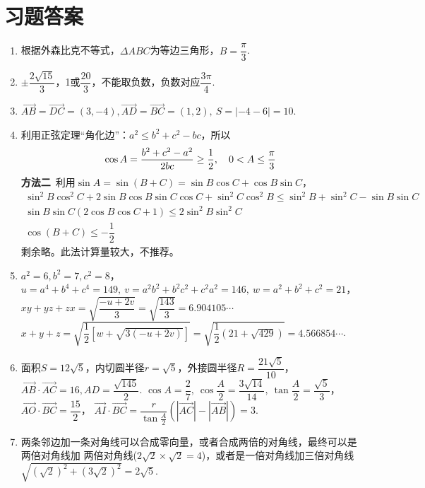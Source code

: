 \section{习题答案}
\begin{enumerate}[label={\textbf{\arabic*.}},leftmargin=
    \inteval{\myenumleftmargin}pt]
\item 
根据外森比克不等式，$ \Delta ABC $为等边三角形，$ B=\dfrac{\pi}{3} $. 

\item 
$ \pm\dfrac{2\sqrt{15}}{3} $，1或$ \dfrac{20}{3} $，不能取负数，负数对应$ \dfrac{3\pi}{4} $. 

\item 
$ \vec{AB}=\vec{DC}=(3,-4),
\vec{AD}=\vec{BC}=(1,2),\ S=|-4-6|=10 $. 

\item 利用正弦定理“角化边”：$ a^2\leq b^2+c^2-bc $，所以
\begin{gather*}
    \cos A=\dfrac{b^2+c^2-a^2}{2bc}\geq \dfrac{1}{2},
    \quad 0<A\leq \dfrac{\pi}{3}
\end{gather*}
\textbf{方法二}\ 利用$ \sin A=\sin(B+C)=\sin B\cos C+\cos B\sin C $，
\begin{gather*}
    \sin^2B\cos^2C+2\sin B\cos B\sin C\cos C+\sin^2C\cos^2B
    \leq \sin^2B+\sin^2C-\sin B\sin C \\
    \sin B\sin C(2\cos B\cos C+1)\leq 2\sin^2B \sin^2C \\
    \cos(B+C)\leq -\dfrac{1}{2} 
\end{gather*}
剩余略。此法计算量较大，不推荐。

\item 
$ a^2=6,b^2=7,c^2=8 $，\\
$ u=a^4+b^4+c^4=149,\ v=a^2b^2+b^2c^2+c^2a^2=146 ,\ w=a^2+b^2+c^2=21 $，\\
$ xy+yz+zx=\sqrt{\dfrac{-u+2v}{3}}=\sqrt{\dfrac{143}{3}}=6.904105\cdots $ \\
$ x+y+z=\sqrt{\dfrac{1}{2}[w+\sqrt{3(-u+2v)}]}=
\sqrt{\dfrac{1}{2}(21+\sqrt{429})}=4.566854\cdots $. 

\item 
面积$ S=12\sqrt{5} $，内切圆半径$ r=\sqrt{5}$，外接圆半径$ R=\dfrac{21
    \sqrt{5}}{10} $，$ \vec{AB}\cdot \vec{AC} = 16,
AD=\dfrac{\sqrt{145}}{2} $. 
$ \cos A=\dfrac{2}{7},\ \cos\dfrac{A}{2}=\dfrac{3\sqrt{14}}{14},\ \tan\dfrac{A}{2}=
\dfrac{\sqrt{5}}{3} $，
$ \vec{AO}\cdot\vec{BC}=\dfrac{15}{2} $，
$ \vec{AI}\cdot\vec{BC}=\dfrac{r}{\tan \frac{A}{2}}
\left(|\vec{AC}|-|\vec{AB}|\right)=3 $. 

\item 
两条邻边加一条对角线可以合成零向量，或者合成两倍的对角线，最终可以是两倍对角线加
两倍对角线($ 2\sqrt{2}\times \sqrt{2} =4 $)，或者是一倍对角线加三倍对角线\\
$ \sqrt{(\sqrt{2})^2+(3\sqrt{2})^2}=2\sqrt{5} $. 


\end{enumerate}
